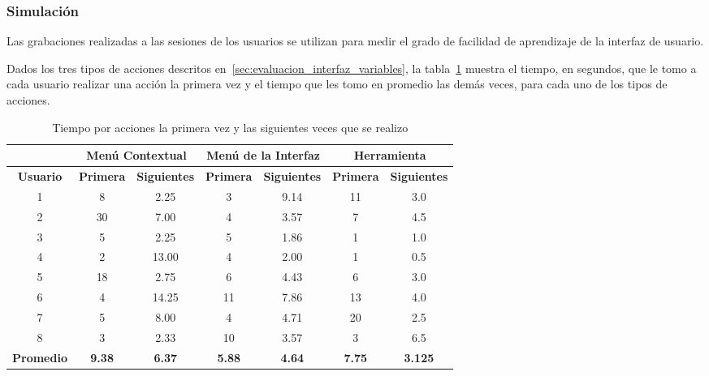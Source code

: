 \subsubsection{Simulación}

Las grabaciones realizadas a las sesiones de los usuarios se utilizan para medir
el grado de facilidad de aprendizaje de la interfaz de usuario.

Dados los tres tipos de acciones descritos en~\ref{sec:evaluacion_interfaz_variables}, la
tabla~\ref{tab:interfaz_tiempo_acciones} muestra el tiempo, en segundos,
que le tomo a cada usuario realizar una acción la primera vez y 
el tiempo que les tomo en promedio las demás veces, para cada uno de los tipos 
de acciones.


\begin{table}[!hbt]
\centering
\begin{tabular}{|c|c|c|c|c|c|c|}
\hline
& \multicolumn{2}{c|}{\textbf{Menú Contextual}} &
\multicolumn{2}{c|}{\textbf{Menú de la Interfaz}} & \multicolumn{2}{c|}{\textbf{Herramienta}}\\
\hline
\textbf{Usuario}  & \textbf{Primera} & \textbf{Siguientes} & \textbf{Primera} & \textbf{Siguientes} & \textbf{Primera} & \textbf{Siguientes} \\
\hline 1          & 8                & 2.25                & 3                & 9.14                & 11               & 3.0 \\
\hline 2          & 30               & 7.00                & 4                & 3.57                & 7                & 4.5 \\
\hline 3          & 5                & 2.25                & 5                & 1.86                & 1                & 1.0 \\
\hline 4          & 2                & 13.00               & 4                & 2.00                & 1                & 0.5 \\
\hline 5          & 18               & 2.75                & 6                & 4.43                & 6                & 3.0 \\
\hline 6          & 4                & 14.25               & 11               & 7.86                & 13               & 4.0 \\
\hline 7          & 5                & 8.00                & 4                & 4.71                & 20               & 2.5 \\
\hline 8          & 3                & 2.33                & 10               & 3.57                & 3                & 6.5 \\
\hline
\textbf{Promedio} & \textbf{9.38}    & \textbf{6.37}       & \textbf{5.88}    & \textbf{4.64}       & \textbf{7.75}    & \textbf{3.125} \\
\hline
\end{tabular}
\caption{Tiempo por acciones la primera vez y las siguientes veces que se realizo}
\label{tab:interfaz_tiempo_acciones}
\end{table}

